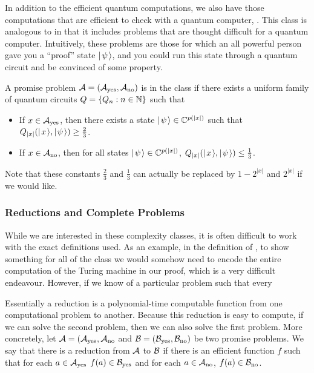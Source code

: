 \documentclass[../thesis-main/thesis-main]{subfiles}
\begin{document}
In addition to the efficient quantum computations, we also have those computations that are efficient to check with a quantum computer, \QMA.  This class is analogous to \NP{} in that it includes problems that are thought difficult for a quantum computer.  Intuitively, these problems are those for which an all powerful person gave you a ``proof'' state $|\mspace{2mu} \psi \mspace{2mu} \rangle$, and you could run this state through a quantum circuit and be convinced of some property.

\begin{definition}[\QMA]  A promise problem $\mathcal{A} = (\mathcal{A}_{\text{yes}},\mathcal{A}_{\text{no}})$ is in the class \QMA{} if there exists a uniform family of quantum circuits $Q=\{Q_n:n\in \mathbb{N}\}$ such that
\begin{itemize}
  \item If $x\in \mathcal{A}_{\text{yes}}$, then there exists a state $|\mspace{2mu} \psi \mspace{2mu} \rangle\in \mathbb{C}^{p(|x|)}$ such that $Q_{|x|}(|\mspace{2mu} x \mspace{2mu} \rangle,|\mspace{2mu} \psi \mspace{2mu} \rangle) \geq \frac{2}{3}$.
  \item If $x\in \mathcal{A}_{\text{no}}$, then for all states $|\mspace{2mu} \psi \mspace{2mu} \rangle\in \mathbb{C}^{p(|x|)}$, $Q_{|x|}(|\mspace{2mu} x \mspace{2mu} \rangle,|\mspace{2mu} \psi \mspace{2mu} \rangle) \leq \frac{1}{3}$.
\end{itemize}
\end{definition}

Note that these constants $\frac{2}{3}$ and $\frac{1}{3}$ can actually be replaced by $1-2^{|x|}$ and $2^{|x|}$ if we would like.

\subsubsection{Reductions and Complete Problems}

While we are interested in these complexity classes, it is often difficult to work with the exact definitions used.  As an example, in the definition of \NP, to show something for all of the class we would somehow need to encode the entire computation of the Turing machine in our proof, which is a very difficult endeavour.  However, if we know of a particular problem such that every 

Essentially a reduction is a polynomial-time computable function from one computational problem to another.  Because this reduction is easy to compute, if we can solve the second problem, then we can also solve the first problem.  More concretely, let $\mathcal{A} = (\mathcal{A}_{\text{yes}},\mathcal{A}_{\text{no}}$ and $\mathcal{B}=(\mathcal{B}_{\text{yes}},\mathcal{B}_{\text{no}})$ be two promise problems.  We say that there is a reduction from $\mathcal{A}$ to $\mathcal{B}$ if there is an efficient function $f$ such that for each $a\in \mathcal{A}_{\text{yes}}$ $f(a)\in \mathcal{B}_{\text{yes}}$ and for each $a\in \mathcal{A}_{\text{no}}$, $f(a) \in \mathcal{B}_{\text{no}}$.  
\end{document}

